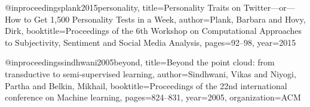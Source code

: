 @inproceedings{plank2015personality,
  title={Personality Traits on Twitter—or—How to Get 1,500 Personality Tests in a Week},
  author={Plank, Barbara and Hovy, Dirk},
  booktitle={Proceedings of the 6th Workshop on Computational Approaches to Subjectivity, Sentiment and Social Media Analysis},
  pages={92--98},
  year={2015}
}

@inproceedings{sindhwani2005beyond,
  title={Beyond the point cloud: from transductive to semi-supervised learning},
  author={Sindhwani, Vikas and Niyogi, Partha and Belkin, Mikhail},
  booktitle={Proceedings of the 22nd international conference on Machine learning},
  pages={824--831},
  year={2005},
  organization={ACM}
}




